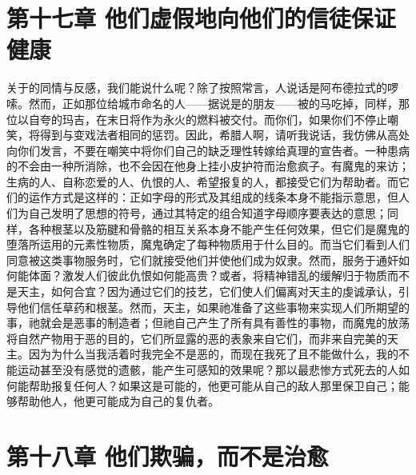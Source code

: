 
\section{第十七章 他们虚假地向他们的信徒保证健康}

关于的同情与反感，我们能说什么呢？除了按照常言，人说话是阿布德拉式的啰嗦。然而，正如那位给城市命名的人——据说是的朋友——被的马吃掉，同样，那位以自夸的玛吉，在末日将作为永火的燃料被交付。而你们，如果你们不停止嘲笑，将得到与变戏法者相同的惩罚。因此，希腊人啊，请听我说话，我仿佛从高处向你们发言，不要在嘲笑中将你们自己的缺乏理性转嫁给真理的宣告者。一种患病的不会由一种所消除，也不会因在他身上挂小皮护符而治愈疯子。有魔鬼的来访；生病的人、自称恋爱的人、仇恨的人、希望报复的人，都接受它们为帮助者。而它们的运作方式是这样的：正如字母的形式及其组成的线条本身不能指示意思，但人们为自己发明了思想的符号，通过其特定的组合知道字母顺序要表达的意思；同样，各种根茎以及筋腱和骨骼的相互关系本身不能产生任何效果，但它们是魔鬼的堕落所运用的元素性物质，魔鬼确定了每种物质用于什么目的。而当它们看到人们同意被这类事物服务时，它们就接受他们并使他们成为奴隶。然而，服务于通奸如何能体面？激发人们彼此仇恨如何能高贵？或者，将精神错乱的缓解归于物质而不是天主，如何合宜？因为通过它们的技艺，它们使人们偏离对天主的虔诚承认，引导他们信任草药和根茎。然而，天主，如果祂准备了这些事物来实现人们所期望的事，祂就会是恶事的制造者；但祂自己产生了所有具有善性的事物，而魔鬼的放荡将自然产物用于恶的目的，它们所显露的恶的表象来自它们，而非来自完美的天主。因为为什么当我活着时我完全不是恶的，而现在我死了且不能做什么，我的不能运动甚至没有感觉的遗骸，能产生可感知的效果呢？那以最悲惨方式死去的人如何能帮助报复任何人？如果这是可能的，他更可能从自己的敌人那里保卫自己；能够帮助他人，他更可能成为自己的复仇者。\par


\section{第十八章 他们欺骗，而不是治愈}

